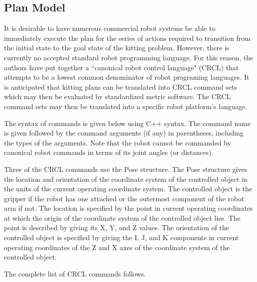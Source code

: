 \subsection{Plan Model}
\label{sect:Implementation.CRCL}
It is desirable to have numerous commercial robot systems be able to 
immediately execute the plan for the series of actions required to transition from the initial state
to the goal state of the kitting problem. However, there is currently no
accepted standard robot programming language. For this reason, the authors
have put together a ``canonical robot control language" (CRCL) that attempts to be
a lowest common denominator of robot programing languages. It is anticipated
that kitting plans can be translated into  CRCL command sets which may then be
evaluated by standardized metric software. The CRCL command sets may then
be translated into a specific robot platform's language.

The syntax of commands is given below using C++ syntax. The command
name is given followed by the command arguments (if any) in parentheses,
including the types of the arguments.
Note that the robot cannot be commanded by canonical robot commands in
terms of its joint angles (or distances).

Three of the CRCL commands use the Pose structure. The Pose structure gives
the location and orientation of the coordinate system of the controlled
object in the units of the current operating coordinate system. 
The controlled object is the gripper if the robot has one attached
or the outermost component of the robot arm if not.  The location is
specified by the point in current operating coordinates at which the
origin of the coordinate system of the controlled object lies. The point is
described by giving its X, Y, and Z values. The orientation of the
controlled object is specified by giving the I, J, and K components in
current operating coordinates of the Z and X axes of the coordinate
system of the controlled object. 

The complete list of CRCL commands follows.\\

